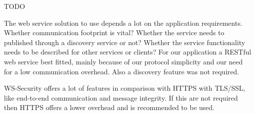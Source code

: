 TODO

The web service solution to use depends a lot on the application requirements. Whether communication footprint is vital? Whether the service needs to published through a discovery service or not? Whether the service functionality needs to be described for other services or clients? For our application a RESTful web service best fitted, mainly because of our protocol simplicity and our need for a low communication overhead. Also a discovery feature was not required.

WS-Security offers a lot of features in comparison with HTTPS with TLS/SSL, like end-to-end communication and message integrity. If this are not required then HTTPS offers a lower overhead and is recommended to be used.